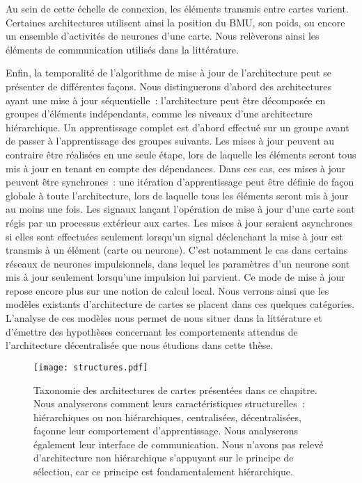 \documentclass[../main]{subfiles}
\begin{document}
Au sein de cette échelle de connexion, les éléments transmis entre cartes varient. 
Certaines architectures utilisent ainsi la position du BMU, son poids, ou encore un ensemble d'activités de neurones d'une carte. Nous relèverons ainsi les éléments de communication utilisés dans la littérature.

Enfin, la temporalité de l'algorithme de mise à jour de l'architecture peut se présenter de différentes façons. Nous distinguerons d'abord des architectures ayant une mise à jour séquentielle~: l'architecture peut être décomposée en groupes d'éléments indépendants, comme les niveaux d'une architecture hiérarchique. 
Un apprentissage complet est d'abord effectué sur un groupe avant de passer à l'apprentissage des groupes suivants. 
Les mises à jour peuvent au contraire être réalisées en une seule étape, lors de laquelle les éléments seront tous mis à jour en tenant en compte des dépendances. Dans ces cas, ces mises à jour peuvent être synchrones~: une itération d'apprentissage peut être définie de façon globale à toute l'architecture, lors de laquelle tous les éléments seront mis à jour au moins une fois. Les signaux lançant l'opération de mise à jour d'une carte sont régis par un processus extérieur aux cartes.
Les mises à jour seraient asynchrones si elles sont effectuées seulement lorsqu'un signal déclenchant la mise à jour est transmis à un élément (carte ou neurone). C'est notamment le cas dans certains réseaux de neurones impulsionnels, dans lequel les paramètres d'un neurone sont mis à jour seulement lorsqu'une impulsion lui parvient. Ce mode de mise à jour repose encore plus sur une notion de calcul local.
Nous verrons ainsi que les modèles existants d'architecture de cartes se placent dans ces quelques catégories. 
L'analyse de ces modèles nous permet de nous situer dans la littérature et d'émettre des hypothèses concernant les comportements attendus de l'architecture décentralisée que nous étudions dans cette thèse. 

\begin{figure}
\centering\texttt{[image: structures.pdf]}
\caption{Taxonomie des architectures de cartes présentées dans ce chapitre. Nous analyserons comment leurs caractéristiques structurelles~: hiérarchiques ou non hiérarchiques, centralisées, décentralisées, façonne leur comportement d'apprentissage. Nous analyserons également leur interface de communication. Nous n'avons pas relevé d'architecture non hiérarchique s'appuyant sur le principe de sélection, car ce principe est fondamentalement hiérarchique. \label{fig:taxo}}
\end{figure}
\end{document}
